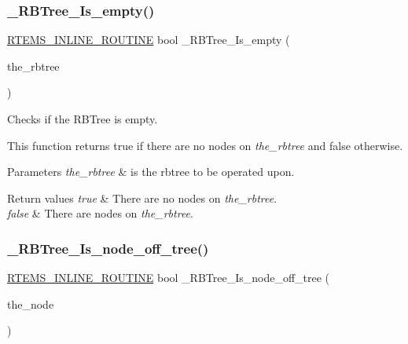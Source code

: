  \mbox{\label{group__RTEMSScoreRBTree_ga26bddef2c5a0e1f832d7673c45b284c7}} 
\subsubsection{\texorpdfstring{\_RBTree\_Is\_empty()}{\_RBTree\_Is\_empty()}}
{\footnotesize\ttfamily \mbox{\hyperlink{group__RTEMSScoreBaseDefs_gac216239df231d5dbd15e3520b0b9313f}{R\+T\+E\+M\+S\+\_\+\+I\+N\+L\+I\+N\+E\+\_\+\+R\+O\+U\+T\+I\+NE}} bool \+\_\+\+R\+B\+Tree\+\_\+\+Is\+\_\+empty (\begin{DoxyParamCaption}\item[{const R\+B\+Tree\+\_\+\+Control $\ast$}]{the\+\_\+rbtree }\end{DoxyParamCaption})}



Checks if the R\+B\+Tree is empty. 

This function returns true if there are no nodes on {\itshape the\+\_\+rbtree} and false otherwise.


\begin{DoxyParams}{Parameters}
{\em the\+\_\+rbtree} & is the rbtree to be operated upon.\\
\hline
\end{DoxyParams}

\begin{DoxyRetVals}{Return values}
{\em true} & There are no nodes on {\itshape the\+\_\+rbtree}. \\
\hline
{\em false} & There are nodes on {\itshape the\+\_\+rbtree}. \\
\hline
\end{DoxyRetVals}
\mbox{\label{group__RTEMSScoreRBTree_ga4076722f9dbc78d8e6682b88a3ed0c8e}} 
\subsubsection{\texorpdfstring{\_RBTree\_Is\_node\_off\_tree()}{\_RBTree\_Is\_node\_off\_tree()}}
{\footnotesize\ttfamily \mbox{\hyperlink{group__RTEMSScoreBaseDefs_gac216239df231d5dbd15e3520b0b9313f}{R\+T\+E\+M\+S\+\_\+\+I\+N\+L\+I\+N\+E\+\_\+\+R\+O\+U\+T\+I\+NE}} bool \+\_\+\+R\+B\+Tree\+\_\+\+Is\+\_\+node\+\_\+off\+\_\+tree (\begin{DoxyParamCaption}\item[{const \mbox{\hyperlink{structRBTree__Node}{R\+B\+Tree\+\_\+\+Node}} $\ast$}]{the\+\_\+node }\end{DoxyParamCaption})}



